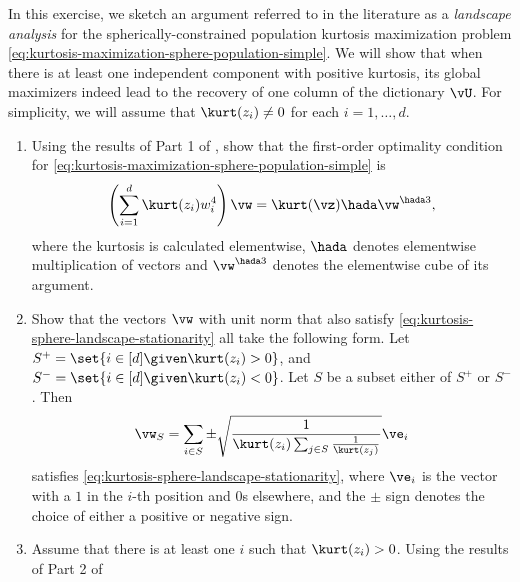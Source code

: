 \documentclass[../../book-main.tex]{subfiles}
\begin{document}
\begin{exercise}\label{exercise:kurtosis-sphere-landscape}
    In this exercise, we sketch an argument referred to in the
    literature as a \textit{landscape analysis} for the
    spherically-constrained population kurtosis maximization problem
    \eqref{eq:kurtosis-maximization-sphere-population-simple}. We
    will show that when there is at least one independent component
    with positive kurtosis, its
    global maximizers indeed lead to the recovery of one column of
    the dictionary $\vU$.
    For simplicity, we will assume that $\kurt(z_i) \neq 0$ for each
    $i = 1, \dots, d$.
    \begin{enumerate}
        \item Using the results of Part 1 of ,
            show that the first-order optimality condition for
            \eqref{eq:kurtosis-maximization-sphere-population-simple} is
            \begin{equation}\label{eq:kurtosis-sphere-landscape-stationarity}
                \left(\sum_{i=1}^d \kurt(z_i) w_i^4 \right)
                \vw = \kurt(\vz) \hada \vw^{\hada 3},
            \end{equation}
            where the kurtosis is calculated elementwise, $\hada$
            denotes elementwise multiplication of vectors and
            $\vw^{\hada 3}$ denotes the elementwise cube of its argument.
        \item Show that the vectors $\vw$ with unit norm that also
            satisfy \eqref{eq:kurtosis-sphere-landscape-stationarity}
            all take the following form.
            Let $S^+ = \set{i \in [d] \given \kurt(z_i) > 0}$, and
            $S^- = \set{i \in [d] \given \kurt(z_i) < 0}$.
            Let $S$ be a subset either of $S^+$ or $S^-$.
            Then
            \begin{equation}\label{eq:kurtosis-sphere-landscape-cps}
                \vw_S = \sum_{i \in S} \pm \sqrt{\frac{1}{\kurt(z_i)
                \sum_{j \in S} \frac{1}{\kurt(z_j)}}} \ve_i
            \end{equation}
            satisfies \eqref{eq:kurtosis-sphere-landscape-stationarity},
            where $\ve_i$ is the vector with a $1$ in the $i$-th
            position and $0$s elsewhere, and the $\pm$ sign denotes
            the choice of either a positive or negative sign.
        \item Assume that there is at least one $i$ such that
            $\kurt(z_i) > 0$. Using the results of Part 2 of

\end{enumerate}
\end{exercise}
\end{document}

